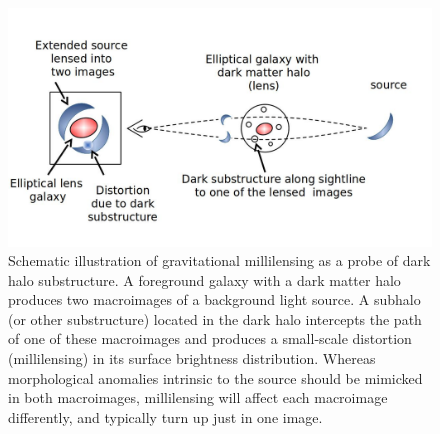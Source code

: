 \documentclass[a4paper, 11pt]{article}
\begin{document}
\begin{figure}[tbh]
\centering
\includegraphics[scale=0.3]{Figure_lensing.jpg}
\caption{Schematic illustration of gravitational millilensing as a probe of dark halo substructure. A foreground galaxy with a dark matter halo produces two macroimages of a background light source. A subhalo (or other substructure) located in the dark halo intercepts the path of one of these macroimages and produces a small-scale distortion (millilensing) in its surface brightness distribution. Whereas morphological anomalies intrinsic to the source should be mimicked in both macroimages, millilensing will affect each macroimage differently, and typically turn up just in one image.}
\end{figure}

\end{document}
